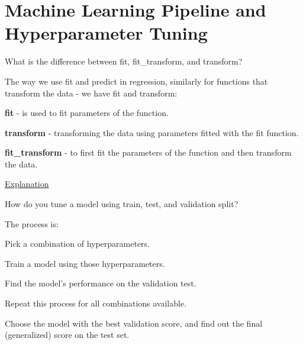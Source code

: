 	\chapter{Machine Learning Pipeline and Hyperparameter Tuning}

	\resetquestioncounter{}
	\begin{qanda}
		\begin{question}
What is the difference between fit, fit\_transform, and transform?
		\end{question}

		\begin{answer}
The way we use fit and predict in regression, similarly for functions that transform the data - we have fit and transform:

\textbf{fit} - is used to fit parameters of the function.

\textbf{transform} - transforming the data using parameters fitted with the fit function.

\textbf{fit\_transform} - to first fit the parameters of the function and then transform the data.

\href{https://towardsdatascience.com/what-and-why-behind-fit-transform-vs-transform-in-scikit-learn-78f915cf96fe}{Explanation}
		\end{answer}
	\end{qanda}

	\begin{qanda}
		\begin{question}
How do you tune a model using train, test, and validation split?
		\end{question}

		\begin{answer}
The process is:
			\begin{numberedlist}
				\item Pick a combination of hyperparameters.
				\item Train a model using those hyperparameters.
				\item Find the model's performance on the validation test.
				\item Repeat this process for all combinations available.
				\item Choose the model with the best validation score, and find out the final (generalized) score on the test set.
			\end{numberedlist}
		\end{answer}
	\end{qanda}

